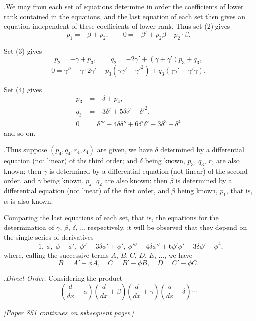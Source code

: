 \documentclass[11pt]{article}
\begin{document}
\medskip

.\quad We may from each set of equations determine in order the coefficients of lower rank contained in the equations, and the last equation of each set then gives an equation independent of these coefficients of lower rank. Thus set (2) gives
\[
p_1 = -\beta + p_2;\qquad 0 = -\beta' + p_2\beta - p_2\cdot\beta.
\]

Set (3) gives
\[
p_2 = -\gamma + p_3,\qquad q_2 = -2\gamma' + (\gamma + \gamma')p_3 + q_3,
\]
\[
0 = \gamma'' - \gamma\cdot 2\gamma' + p_3(\gamma\gamma' - \gamma'^2) + q_3(\gamma\gamma' - \gamma'\gamma).
\]

Set (4) gives
\begin{align*}
p_3 &= -\delta + p_4,\\
q_3 &= -3\delta' + 5\delta\delta' - \delta'^2,\\
0 &= \delta''' - 4\delta\delta'' + 6\delta'\delta' - 3\delta^3 - \delta^4
\end{align*}
and so on.

\medskip

.\quad Thus suppose $(p_4,q_4,r_4,s_4)$ are given, we have $\delta$ determined by a differential equation (not linear) of the third order; and $\delta$ being known, $p_3$, $q_3$, $r_3$ are also known; then $\gamma$ is determined by a differential equation (not linear) of the second order, and $\gamma$ being known, $p_2$, $q_2$ are also known; then $\beta$ is determined by a differential equation (not linear) of the first order, and $\beta$ being known, $p_1$, that is, $\alpha$ is also known.

Comparing the last equations of each set, that is, the equations for the determination of $\gamma$, $\beta$, $\delta$, $\dotsc$ respectively, it will be observed that they depend on the single series of derivatives
\[
-1,\;\phi,\;\phi-\phi',\;\phi''-3\delta\phi'+\phi',\;\phi'''-4\delta\phi''+6\phi'\phi'-3\delta\phi'-\phi^4,
\]
where, calling the successive terms $A$, $B$, $C$, $D$, $E$, $\dotsc$, we have
\[
B = A' - \phi A,\quad C = B' - \phi B,\quad D = C' - \phi C.
\]

\medskip

.\quad \emph{Direct Order.} Considering the product
\[
\left(\frac{d}{dx} + \alpha\right)\!\left(\frac{d}{dx} + \beta\right)\!\left(\frac{d}{dx} + \gamma\right)\!\left(\frac{d}{dx} + \delta\right)\dotsb
\]

\bigskip
\noindent\emph{[Paper 851 continues on subsequent pages.]}
\end{document}
